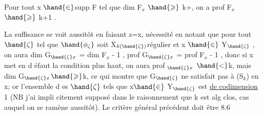  Pour tout  x $\hand{\in}$supp F tel que dim F$_x$ $\hand{\geqslant}$ k+, on a prof F$_x$ $\hand{\geqslant}$ k+1 .

La suffisance se voit aussitôt en faisant z=x,  nécessité   en
notant que pour tout $\hand{\zeta}$ tel que $\hand{\phi_\zeta}$ soit X$_{k(\hand{\zeta})}$\hand{-}régulier et x $\hand{\in}$ Y$_{\hand{\zeta}}$ ,
on aura dim G$_{\hand{\zeta} x}$ = dim F$_x$ - 1 , prof G$_{\hand{\zeta} x}$ = prof F$_x$ - 1 , donc si
x met en d éfaut la condition plus haut, on aura prof $_{\hand{\zeta} x}$ $\hand{<}$k, mais
dim G$_{\hand{\zeta} x}$$\hand{\geqslant}$k, ce qui montre que G$_{\hand{\zeta}}$ ne satisfait pas à (S$_k$) en x; or
l'ensemble d es $\hand{\zeta}$ tels que x$\hand{\in}$ Y$_{\hand{\zeta}}$ est \uline{de codimension} 1 (NB j'ai impli
 citement supposé dans le raisonnement que k est alg clos, cas auquel on
se ramène aussitôt). Le critère général précédent doit être   8.6
